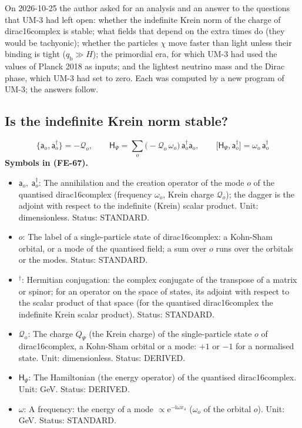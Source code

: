 \documentclass[
  10pt,
]{article}
\providecommand{\tightlist}{%
  \setlength{\itemsep}{0pt}\setlength{\parskip}{0pt}}
\begin{document}
On 2026-10-25 the author asked for an analysis and an answer to the
questions that UM-3 had left open: whether the indefinite Krein norm of
the charge of dirac16complex is stable; what fields that depend on the
extra times do (they would be tachyonic); whether the particles \(\chi\)
move faster than light unless their binding is tight
(\(q_{\mathrm{b}} \gg H\)); the primordial era, for which UM-3 had used
the values of Planck 2018 as inputs; and the lightest neutrino mass and
the Dirac phase, which UM-3 had set to zero. Each was computed by a new
program of UM-3; the answers follow.

\hypertarget{is-the-indefinite-krein-norm-stable}{%
\subsection{Is the indefinite Krein norm
stable?}\label{is-the-indefinite-krein-norm-stable}}

\[
\big\{\mathsf{a}_o, \mathsf{a}_o^\dagger\big\} = -\mathcal{Q}_o,\qquad
\mathsf{H}_\Psi = \sum_o\big(-\mathcal{Q}_o\,\omega_o\big)\,\mathsf{a}_o^\dagger\mathsf{a}_o,\qquad
\big[\mathsf{H}_\Psi, \mathsf{a}_o^\dagger\big] = \omega_o\,\mathsf{a}_o^\dagger \tag{FE-67}
\] \textbf{Symbols in (FE-67).}

\begin{itemize}
\tightlist
\item
  \(\mathsf{a}_o,\ \mathsf{a}_o^\dagger\): The annihilation and the
  creation operator of the mode \(o\) of the quantised dirac16complex
  (frequency \(\omega_o\), Krein charge \(\mathcal{Q}_o\)); the dagger
  is the adjoint with respect to the indefinite (Krein) scalar product.
  Unit: dimensionless. Status: STANDARD.
\item
  \(o\): The label of a single-particle state of dirac16complex: a
  Kohn-Sham orbital, or a mode of the quantised field; a sum over \(o\)
  runs over the orbitals or the modes. Status: STANDARD.
\item
  \({}^\dagger\): Hermitian conjugation: the complex conjugate of the
  transpose of a matrix or spinor; for an operator on the space of
  states, its adjoint with respect to the scalar product of that space
  (for the quantised dirac16complex the indefinite Krein scalar
  product). Status: STANDARD.
\item
  \(\mathcal{Q}_o\): The charge \(Q_\Psi\) (the Krein charge) of the
  single-particle state \(o\) of dirac16complex, a Kohn-Sham orbital or
  a mode: \(+1\) or \(-1\) for a normalised state. Unit: dimensionless.
  Status: DERIVED.
\item
  \(\mathsf{H}_\Psi\): The Hamiltonian (the energy operator) of the
  quantised dirac16complex. Unit: GeV. Status: DERIVED.
\item
  \(\omega\): A frequency: the energy of a mode
  \(\propto \mathrm{e}^{-\mathrm{i}\omega x_4}\) (\(\omega_o\) of the
  orbital \(o\)). Unit: GeV. Status: STANDARD.
\end{itemize}
\end{document}
